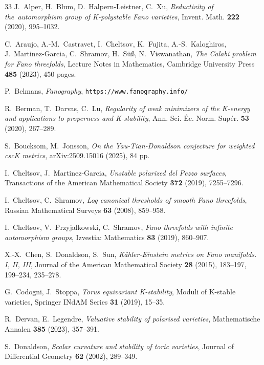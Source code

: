 \documentclass[12pt]{amsart}
\theoremstyle{definition}
\theoremstyle{remark}
\begin{document}
\begin{thebibliography}{33}
J.~Alper, H.~Blum, D.~Halpern-Leistner, C.~Xu, \textit{Reductivity of the~automorphism group of K-polystable Fano varieties}, Invent. Math. \textbf{222} (2020), 995--1032.

C.~Araujo, A.-M.~Castravet, I.~Cheltsov, K.~Fujita, A.-S.~Kaloghiros, J.~Martinez-Garcia, C.~Shramov, H.~S\"u\ss, N.~Viswanathan,
\textit{The Calabi problem for Fano threefolds}, Lecture Notes in Mathematics, Cambridge University Press \textbf{485} (2023), 450 pages.

P.~Belmans, \textit{Fanography}, \texttt{https://www.fanography.info/}

R.~Berman, T.~Darvas, C.~Lu, \textit{Regularity of weak minimizers of the K-energy and applications to properness and K-stability}, Ann. Sci. Éc. Norm. Supér. \textbf{53} (2020), 267--289.

S.~Boucksom, M.~Jonsson, \textit{On the Yau-Tian-Donaldson conjecture for weighted cscK metrics}, arXiv:2509.15016  (2025), 84 pp.

I.~Cheltsov, J.~Martinez-Garcia, \textit{Unstable polarized del Pezzo surfaces}, Transactions of the American Mathematical Society \textbf{372} (2019), 7255--7296.

I.~Cheltsov, C.~Shramov, \textit{Log canonical thresholds of smooth Fano threefolds}, Russian Mathematical Surveys \textbf{63} (2008), 859--958.

I.~Cheltsov, V.~Przyjalkowski, C.~Shramov, \textit{Fano threefolds with infinite automorphism groups}, Izvestia: Mathematics \textbf{83} (2019), 860--907.

X.-X.~Chen, S.~Donaldson, S.~Sun, \textit{K\"ahler-Einstein metrics on Fano manifolds. I, II, III}, Journal of the American Mathematical Society \textbf{28} (2015), 183--197, 199--234, 235--278.

G.~Codogni, J.~Stoppa, \textit{Torus equivariant K-stability}, Moduli of K-stable varieties,  Springer INdAM Series \textbf{31} (2019), 15--35.

R.~Dervan, E.~Legendre, \textit{Valuative stability of polarised varieties}, Mathematische Annalen \textbf{385} (2023), 357--391.

S.~Donaldson, \textit{Scalar curvature and stability of toric varieties}, Journal of Differential Geometry \textbf{62} (2002), 289--349.


\end{thebibliography}
\end{document}
